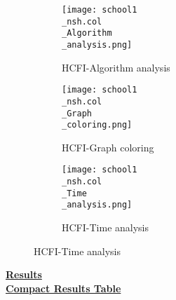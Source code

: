 \documentclass[10pt]{article}
\begin{document}
\graphicspath{{./Core1/Solutions/HCFI/school1\_nsh.col}}
\begin{figure}[H]
\begin{subfigure}{.33\textwidth}
  \centering
  \texttt{[image: school1\\\_nsh.col\\\_Algorithm\\\_analysis.png]}
  \caption{HCFI-Algorithm analysis}
   \label{fig:subfig1}
\end{subfigure}%
\begin{subfigure}{.33\textwidth}
  \centering
  \texttt{[image: school1\\\_nsh.col\\\_Graph\\\_coloring.png]}
  \caption{HCFI-Graph coloring}
  \label{fig:subfig2}
\end{subfigure}
\begin{subfigure}{.33\textwidth}
  \centering
  \texttt{[image: school1\\\_nsh.col\\\_Time\\\_analysis.png]}
  \caption{HCFI-Time analysis}
  \end{subfigure}
\end{figure}
\vspace{2cm}
\begin{center}
\hyperlink{page.8}{\textbf{Results}}\\
\vspace{0.5cm}
\hyperlink{page.71}{\textbf{Compact Results Table}}
\end{center}
\pagebreak
\end{document}
